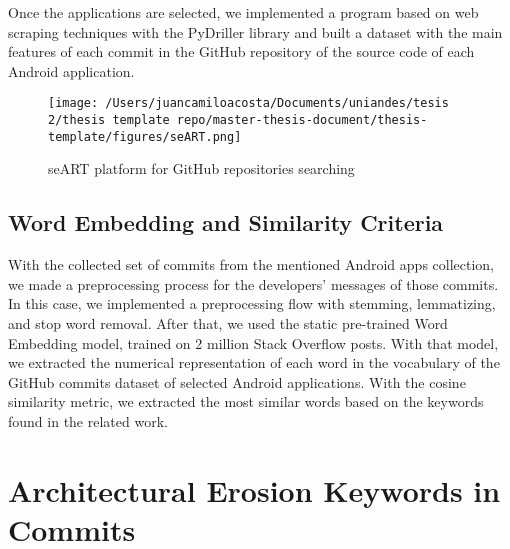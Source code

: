 Once the applications are selected, we implemented a program based on web scraping techniques with the PyDriller library and built a dataset with the main features of each commit in the GitHub repository of the source code of each Android application.

\begin{figure}[h]
    	\centering
    		\texttt{[image: /Users/juancamiloacosta/Documents/uniandes/tesis 2/thesis template repo/master-thesis-document/thesis-template/figures/seART.png]}
   			 \caption{seART platform for GitHub repositories searching \cite{} }
   			 \label{fig:ast}
\end{figure}

\subsection{Word Embedding and Similarity Criteria}
With the collected set of commits from the mentioned Android apps collection, we made a preprocessing process for the developers' messages of those commits. In this case, we implemented a preprocessing flow with stemming, lemmatizing, and stop word removal. After that, we used the static pre-trained Word Embedding model, trained on 2 million Stack Overflow posts. With that model, we extracted the numerical representation of each word in the vocabulary of the GitHub commits dataset of selected Android applications. With the cosine similarity metric, we extracted the most similar words based on the keywords found in the related work.



\section{Architectural Erosion Keywords in Commits}
